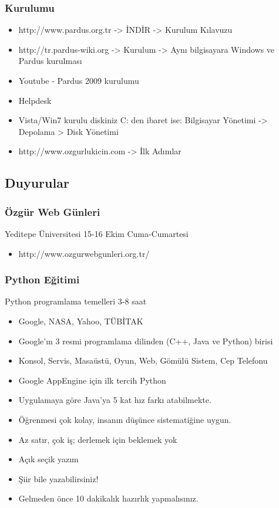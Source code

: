 \documentclass{beamer}
\begin{document}
	\begin{frame}
	 \frametitle{Kurulumu}
		\begin{itemize}
		 \item http://www.pardus.org.tr -> İNDİR -> Kurulum Kılavuzu
		 \item http://tr.pardus-wiki.org -> Kurulum -> Aynı bilgisayara Windows ve Pardus kurulması
		 \item Youtube - Pardus 2009 kurulumu
		 \item Helpdesk
		 \item Vista/Win7 kurulu diskiniz C: den ibaret ise: Bilgisayar Yönetimi -> Depolama > Disk Yönetimi
		 \item http://www.ozgurlukicin.com -> İlk Adımlar
		\end{itemize}

	\end{frame}


	\subsection{Duyurular}
	\begin{frame}
	\frametitle{Özgür Web Günleri}
			Yeditepe Üniversitesi 15-16 Ekim Cuma-Cumartesi
			\begin{itemize}
				\item http://www.ozgurwebgunleri.org.tr/
			\end{itemize}
	\end{frame}
	\begin{frame}
	 \frametitle{Python Eğitimi}
			Python programlama temelleri 3-8 saat
			\begin{itemize}
				\item Google, NASA, Yahoo, TÜBİTAK
				\item Google'ın 3 resmi programlama dilinden (C++, Java ve Python) birisi
				\item Konsol, Servis, Masaüstü, Oyun, Web, Gömülü Sistem, Cep Telefonu
				\item Google AppEngine için ilk tercih Python
				\item Uygulamaya göre Java'ya 5 kat hız farkı atabilmekte.
				\item Öğrenmesi çok kolay, insanın düşünce sistematiğine uygun.
				\item Az satır, çok iş; derlemek için beklemek yok
				\item Açık seçik yazım
				\item Şiir bile yazabilirsiniz!
				\item Gelmeden önce 10 dakikalık hazırlık yapmalısınız.
			\end{itemize}
	\end{frame}
\end{document}
